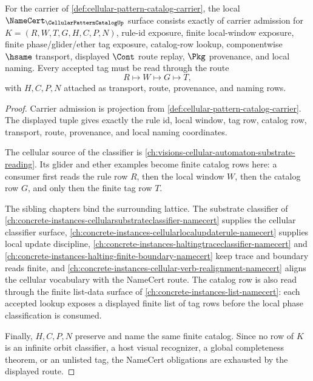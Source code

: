 \begin{theorem}
\label{thm:cellular-pattern-catalog-namecert-obligations}
For the carrier of \autoref{def:cellular-pattern-catalog-carrier}, the local $\NameCert_{\CellularPatternCatalogUp}$ surface consists exactly of carrier admission for $K=(R,W,T,G,H,C,P,N)$, rule-id exposure, finite local-window exposure, finite phase/glider/ether tag exposure, catalog-row lookup, componentwise $\hsame$ transport, displayed $\Cont$ route replay, $\Pkg$ provenance, and local naming. Every accepted tag must be read through the route
$$
R \longmapsto W \longmapsto G \longmapsto T,
$$
with $H,C,P,N$ attached as transport, route, provenance, and naming rows.
\end{theorem}
\begin{proof}
Carrier admission is projection from \autoref{def:cellular-pattern-catalog-carrier}. The displayed tuple gives exactly the rule id, local window, tag row, catalog row, transport, route, provenance, and local naming coordinates.

The cellular source of the classifier is \autoref{ch:visions-cellular-automaton-substrate-reading}. Its glider and ether examples become finite catalog rows here: a consumer first reads the rule row $R$, then the local window $W$, then the catalog row $G$, and only then the finite tag row $T$.

The sibling chapters bind the surrounding lattice. The substrate classifier of \autoref{ch:concrete-instances-cellularsubstrateclassifier-namecert} supplies the cellular classifier surface, \autoref{ch:concrete-instances-cellularlocalupdaterule-namecert} supplies local update discipline, \autoref{ch:concrete-instances-haltingtraceclassifier-namecert} and \autoref{ch:concrete-instances-halting-finite-boundary-namecert} keep trace and boundary reads finite, and \autoref{ch:concrete-instances-cellular-verb-realignment-namecert} aligns the cellular vocabulary with the NameCert route. The catalog row is also read through the finite list-data surface of \autoref{ch:concrete-instances-list-namecert}: each accepted lookup exposes a displayed finite list of tag rows before the local phase classification is consumed.

Finally, $H,C,P,N$ preserve and name the same finite catalog. Since no row of $K$ is an infinite orbit classifier, a host visual recognizer, a global completeness theorem, or an unlisted tag, the NameCert obligations are exhausted by the displayed route.
\end{proof}

